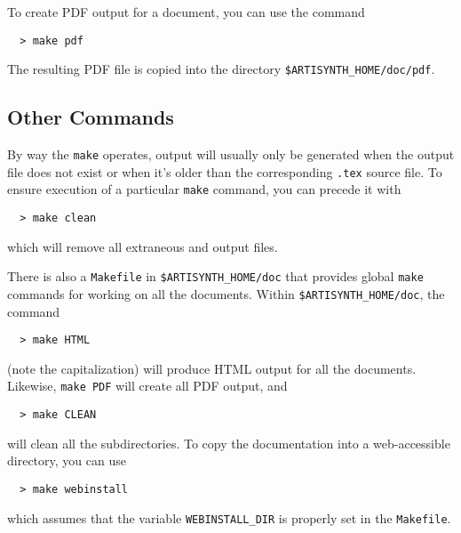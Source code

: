 \documentclass{article}
\begin{document}
To create PDF output for a document, you can use the command
%
\begin{verbatim}
  > make pdf
\end{verbatim}
%
The resulting PDF file is copied into the directory 
{\tt \$ARTISYNTH\_HOME/doc/pdf}.

%
%
%
%
%

\subsection{Other Commands}

By way the {\tt make} operates, output will usually only be generated when
the output file does not exist or when it's older than the
corresponding {\tt .tex} source file. To ensure execution of a particular
{\tt make} command, you can precede it with
%
\begin{verbatim}
  > make clean
\end{verbatim}
%
which will remove all extraneous and output files.

There is also a {\tt Makefile} in {\tt \$ARTISYNTH\_HOME/doc} that
provides global {\tt make} commands for working on all the
documents. Within {\tt \$ARTISYNTH\_HOME/doc}, the command
%
\begin{verbatim}
  > make HTML
\end{verbatim}
%
(note the capitalization) will produce HTML output for
all the documents. Likewise, {\tt make PDF} 
will create all PDF output, and
%
\begin{verbatim}
  > make CLEAN
\end{verbatim}
%
will clean all the subdirectories. To copy the documentation
into a web-accessible directory, you can use
%
\begin{verbatim}
  > make webinstall
\end{verbatim}
%
which assumes that the variable {\tt WEBINSTALL\_DIR} is properly
set in the {\tt Makefile}.
\end{document}
